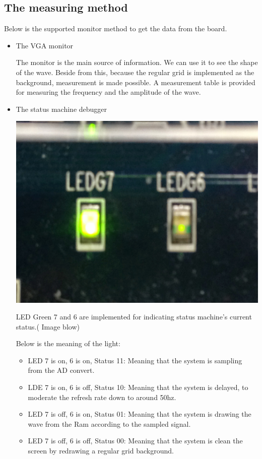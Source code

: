 \documentclass[11pt]{scrartcl}
\begin{document}
\subsection{The measuring method}
Below is the supported monitor method to get the data from the board.
\begin{itemize}
    \item The VGA monitor
    
    The monitor is the main source of information. We can use it to see the shape of the wave. Beside from this, because the regular grid is implemented as the background, measurement is made possible. A measurement table is provided for measuring the frequency and the amplitude of the wave. 
    \item The status machine debugger
    \begin{center}     
\begin{minipage}[t]{\linewidth}

{
\includegraphics[scale = 0.05]{IMG_1386.JPG}
}
\end{minipage}
\medskip
\end{center}

     LED Green 7 and 6 are implemented for indicating status machine's current status.( Image blow)

    
    Below is the meaning of the light:
    \begin{itemize}
        \item LED 7 is on, 6 is on, Status 11:
         Meaning that the system is sampling from the AD convert.
         \item LDE 7 is on, 6 is off, Status 10:
         Meaning that the system is delayed, to moderate the refresh rate down to around 50hz.
         \item LED 7 is off, 6 is on, Status 01:
         Meaning that the system is drawing the wave from the Ram according to the sampled signal.
         \item LED 7 is off, 6 is off, Status 00:
         Meaning that the system is clean the screen by redrawing a regular grid background.
    \end{itemize}  
    

\end{itemize}
\end{document}

